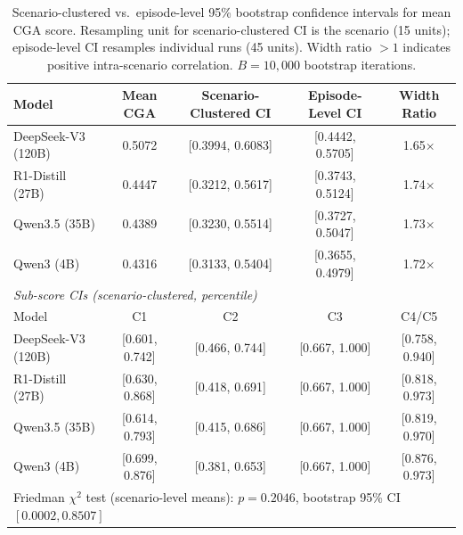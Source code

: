 \begin{table}[t]
\centering
\caption{Scenario-clustered vs.\ episode-level 95\% bootstrap confidence intervals for mean CGA score. Resampling unit for scenario-clustered CI is the scenario (15 units); episode-level CI resamples individual runs (45 units). Width ratio $> 1$ indicates positive intra-scenario correlation. $B = 10{,}000$ bootstrap iterations.}
\label{tab:scenario-clustered-ci}
\begin{tabular}{lcccc}
\toprule
Model & Mean CGA & Scenario-Clustered CI & Episode-Level CI & Width Ratio \\
\midrule
DeepSeek-V3 \small(120B\small) & 0.5072 & [0.3994, 0.6083] & [0.4442, 0.5705] & 1.65$\times$ \\
R1-Distill \small(27B\small) & 0.4447 & [0.3212, 0.5617] & [0.3743, 0.5124] & 1.74$\times$ \\
Qwen3.5 \small(35B\small) & 0.4389 & [0.3230, 0.5514] & [0.3727, 0.5047] & 1.73$\times$ \\
Qwen3 \small(4B\small) & 0.4316 & [0.3133, 0.5404] & [0.3655, 0.4979] & 1.72$\times$ \\
\midrule
\multicolumn{5}{l}{\textit{Sub-score CIs (scenario-clustered, percentile)}} \\
\midrule
Model & C1 & C2 & C3 & C4/C5 \\
\midrule
DeepSeek-V3 \small(120B\small) & [0.601, 0.742] & [0.466, 0.744] & [0.667, 1.000] & [0.758, 0.940] \\
R1-Distill \small(27B\small) & [0.630, 0.868] & [0.418, 0.691] & [0.667, 1.000] & [0.818, 0.973] \\
Qwen3.5 \small(35B\small) & [0.614, 0.793] & [0.415, 0.686] & [0.667, 1.000] & [0.819, 0.970] \\
Qwen3 \small(4B\small) & [0.699, 0.876] & [0.381, 0.653] & [0.667, 1.000] & [0.876, 0.973] \\
\midrule
\multicolumn{5}{l}{Friedman $\chi^2$ test (scenario-level means): $p = 0.2046$, bootstrap 95\% CI $[0.0002, 0.8507]$} \\
\bottomrule
\end{tabular}
\end{table}